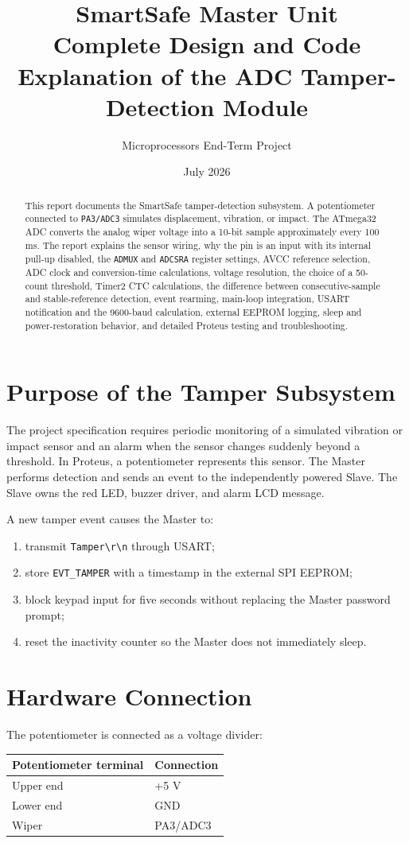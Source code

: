 \documentclass[11pt,a4paper]{article}
\title{\textbf{SmartSafe Master Unit}\\[4pt]
\Large Complete Design and Code Explanation of the ADC Tamper-Detection Module}
\author{Microprocessors End-Term Project}
\date{July 2026}
\begin{document}
\maketitle
\thispagestyle{empty}

\begin{abstract}
This report documents the SmartSafe tamper-detection subsystem. A potentiometer connected to \texttt{PA3/ADC3} simulates displacement, vibration, or impact. The ATmega32 ADC converts the analog wiper voltage into a 10-bit sample approximately every 100 ms. The report explains the sensor wiring, why the pin is an input with its internal pull-up disabled, the \texttt{ADMUX} and \texttt{ADCSRA} register settings, AVCC reference selection, ADC clock and conversion-time calculations, voltage resolution, the choice of a 50-count threshold, Timer2 CTC calculations, the difference between consecutive-sample and stable-reference detection, event rearming, main-loop integration, USART notification and the 9600-baud calculation, external EEPROM logging, sleep and power-restoration behavior, and detailed Proteus testing and troubleshooting.
\end{abstract}

\tableofcontents
\newpage

\section{Purpose of the Tamper Subsystem}
The project specification requires periodic monitoring of a simulated vibration or impact sensor and an alarm when the sensor changes suddenly beyond a threshold. In Proteus, a potentiometer represents this sensor. The Master performs detection and sends an event to the independently powered Slave. The Slave owns the red LED, buzzer driver, and alarm LCD message.

A new tamper event causes the Master to:
\begin{enumerate}
  \item transmit \texttt{Tamper\textbackslash r\textbackslash n} through USART;
  \item store \texttt{EVT\_TAMPER} with a timestamp in the external SPI EEPROM;
  \item block keypad input for five seconds without replacing the Master password prompt;
  \item reset the inactivity counter so the Master does not immediately sleep.
\end{enumerate}

\section{Hardware Connection}
The potentiometer is connected as a voltage divider:
\begin{center}
\begin{tabular}{ll}
\toprule
Potentiometer terminal & Connection \\
\midrule
Upper end & +5 V \\
Lower end & GND \\
Wiper & PA3/ADC3 \\
\bottomrule
\end{tabular}
\end{center}
\end{document}
